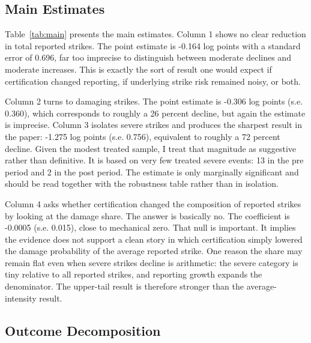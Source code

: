 \documentclass[12pt]{article}
\begin{document}
\subsection{Main Estimates}

\begin{table}[!htbp]
\centering
\caption{Main results}
\label{tab:main}

\end{table}

Table~\ref{tab:main} presents the main estimates. Column 1 shows no clear reduction in total reported strikes. The point estimate is -0.164 log points with a standard error of 0.696, far too imprecise to distinguish between moderate declines and moderate increases. This is exactly the sort of result one would expect if certification changed reporting, if underlying strike risk remained noisy, or both.

Column 2 turns to damaging strikes. The point estimate is -0.306 log points (s.e. 0.360), which corresponds to roughly a 26 percent decline, but again the estimate is imprecise. Column 3 isolates severe strikes and produces the sharpest result in the paper: -1.275 log points (s.e. 0.756), equivalent to roughly a 72 percent decline. Given the modest treated sample, I treat that magnitude as suggestive rather than definitive. It is based on very few treated severe events: 13 in the pre period and 2 in the post period. The estimate is only marginally significant and should be read together with the robustness table rather than in isolation.

Column 4 asks whether certification changed the composition of reported strikes by looking at the damage share. The answer is basically no. The coefficient is -0.0005 (s.e. 0.015), close to mechanical zero. That null is important. It implies the evidence does not support a clean story in which certification simply lowered the damage probability of the average reported strike. One reason the share may remain flat even when severe strikes decline is arithmetic: the severe category is tiny relative to all reported strikes, and reporting growth expands the denominator. The upper-tail result is therefore stronger than the average-intensity result.

\subsection{Outcome Decomposition}


\end{document}
